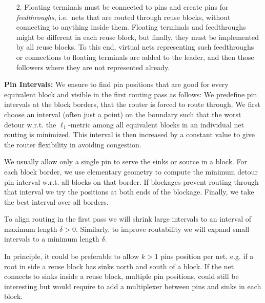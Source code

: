 \documentclass[a2paper]{bigsposter}
\begin{document}
\begin{blockrow}
\begin{enumerate}
\item [{2.}] Floating terminals  must be connected to pins and create pins  for \textit{feedthroughs}, i.e.\
nets that are routed through reuse blocks, without connecting to anything inside them. 
Floating terminals and feedthroughs might be different in each reuse block, but finally, they must be implemented by all reuse blocks. To this end, virtual nets representing such feedthroughs
or connections to floating terminals are added to the leader, and then those followers where they are not represented already.
\end{enumerate}
\textbf{Pin Intervals:}
We ensure to find pin positions that are good for every equivalent block and visible in the first routing pass as follows:
We predefine pin intervals at the block borders, that the router is forced to route through.
We first choose an interval (often just a point) on the boundary such that the worst detour w.r.t. the  $\ell_1$-metric among all equivalent blocks in an individual net routing is minimized.
This interval is then increased  by a constant value to give the router flexibility in avoiding congestion.

We usually allow only a single pin to serve the sinks or source in a block.
For each block border, we use elementary geometry to compute the minimum detour pin interval w.r.t. all blocks on that border.  If blockages prevent
routing through that interval we try the positions at both ends of the
blockage.  Finally, we take the best interval over all borders.

To align routing in the first pass we will shrink large intervals to an interval of maximum  length $\delta>0$.
Similarly, to improve routability we will expand small intervals to a minimum length $\delta$.

In principle, it could be preferable to allow $k>1$ pins position  per net, e.g. if a root in side a reuse block
has sinks north and south of a block.
If the net connects to sinks inside a reuse block, multiple pin positions, could still be interesting but would
require to add a multiplexer between pins and sinks in each block.


\end{blockrow}
\end{document}
